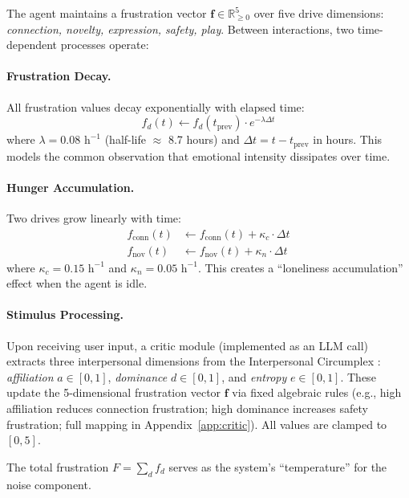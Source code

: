 The agent maintains a frustration vector $\mathbf{f} \in \mathbb{R}^5_{\geq 0}$ over five drive dimensions: \emph{connection, novelty, expression, safety, play}. Between interactions, two time-dependent processes operate:

\paragraph{Frustration Decay.} All frustration values decay exponentially with elapsed time:
\begin{equation}
    f_d(t) \leftarrow f_d(t_{\text{prev}}) \cdot e^{-\lambda \Delta t}
\end{equation}
where $\lambda = 0.08 \text{ h}^{-1}$ (half-life $\approx$ 8.7 hours) and $\Delta t = t - t_{\text{prev}}$ in hours. This models the common observation that emotional intensity dissipates over time.

\paragraph{Hunger Accumulation.} Two drives grow linearly with time:
\begin{align}
    f_{\text{conn}}(t) &\leftarrow f_{\text{conn}}(t) + \kappa_c \cdot \Delta t \\
    f_{\text{nov}}(t) &\leftarrow f_{\text{nov}}(t) + \kappa_n \cdot \Delta t
\end{align}
where $\kappa_c = 0.15 \text{ h}^{-1}$ and $\kappa_n = 0.05 \text{ h}^{-1}$. This creates a ``loneliness accumulation'' effect when the agent is idle.

\paragraph{Stimulus Processing.} Upon receiving user input, a critic module (implemented as an LLM call) extracts three interpersonal dimensions from the Interpersonal Circumplex \citep{leary1957interpersonal,wiggins1979circumplex}: \emph{affiliation} $a \in [0,1]$, \emph{dominance} $d \in [0,1]$, and \emph{entropy} $e \in [0,1]$. These update the 5-dimensional frustration vector $\mathbf{f}$ via fixed algebraic rules (e.g., high affiliation reduces connection frustration; high dominance increases safety frustration; full mapping in Appendix~\ref{app:critic}). All values are clamped to $[0, 5]$.

The total frustration $F = \sum_d f_d$ serves as the system's ``temperature'' for the noise component.

